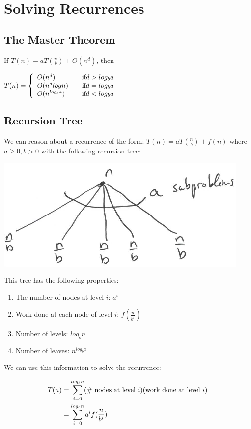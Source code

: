 \chapter{Solving Recurrences}

\section{The Master Theorem}

If $T(n) = aT(\frac{n}{b}) + O(n^d)$, then

\begin{math}
T(n) = \left\{
\begin{array}{l l}
O(n^d)       & \quad \text{if} d > log_ba \\
O(n^d logn)  & \quad \text{if} d = log_ba \\
O(n^{log_ba}) & \quad \text{if} d < log_ba \\
\end{array} \right.
\end{math}

\section{Recursion Tree}

We can reason about a recurrence of the form: $ T(n) = aT(\frac{n}{b})
+ f(n) $ where $ a \geq 0, b > 0 $ with the following recursion tree:

{
  \includegraphics[scale=1.2]{recursion_tree}
  \label{fig:recursion_tree}
}

This tree has the following properties:

\begin{enumerate}
\item The number of nodes at level $i$: $a^i$
\item Work done at each node of level $i$: $f(\frac{n}{b^i})$
\item Number of levels: $log_bn$
\item Number of leaves: $n^{log_ba}$
\end{enumerate}

We can use this information to solve the recurrence:

\begin{align*}
T(n)
&= \displaystyle\sum\limits_{i=0}^{log_bn} 
(\text{\# nodes at level } i) 
(\text{work done at level } i) \\
&= \displaystyle\sum\limits_{i=0}^{log_bn} a^i f(\frac{n}{b^i})
\end{align*}
